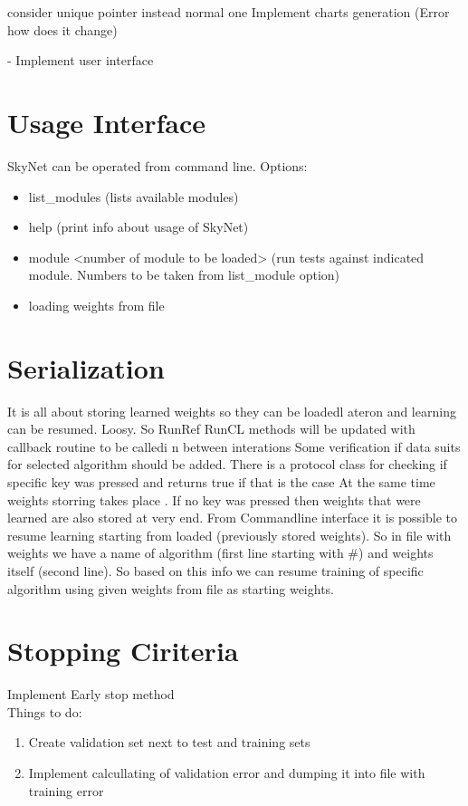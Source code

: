 \documentclass[a4paper,10pt]{article}
\begin{document}
consider unique pointer instead normal one
Implement charts generation (Error how does it change) 

- Implement user interface 
\section{Usage Interface}
SkyNet can be operated from command line. Options:
\begin{itemize}
\item list\_modules (lists available modules)
\item help (print info about usage of SkyNet)
\item module <number of module to be loaded> (run tests against indicated module. Numbers to be taken from list\_module option)
\item loading weights from file
\end{itemize}

\section{Serialization}
It is all about storing learned weights so they can be loadedl ateron and learning can be resumed.
Loosy. So RunRef RunCL methods will be updated with callback routine to be calledi n between interations
Some verification if data suits for selected algorithm should be added. 
There is a protocol class for checking if specific key was pressed and returns true if that is the case
At the same time weights storring takes place . If no key was pressed then weights that were learned are also stored at very end.
From Commandline interface it is possible to resume learning starting from loaded (previously stored weights).
So in file with weights we have a name of algorithm (first line starting with \#) and weights itself (second line). So
based on this info we can resume training of specific algorithm using given weights from file as starting weights.

\section{Stopping Ciriteria}
Implement Early stop method\\
Things to do:
\begin{enumerate}
\item Create validation set next to test and training sets
\item Implement calcullating of validation error and dumping it into file with training error 
\end{enumerate}
\end{document}
